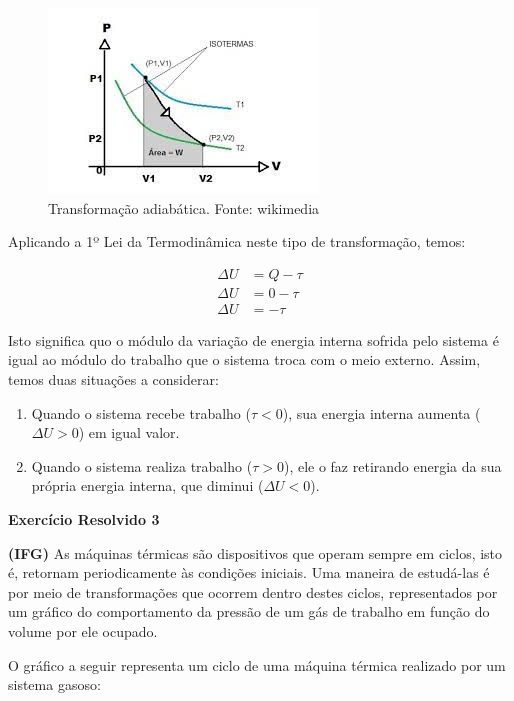 \documentclass[12pt]{article}
\begin{document}
\begin{figure}[h]{}
\centering\includegraphics[width=2.5truein]{img11.jpg}
\caption{Transformação adiabática. Fonte: wikimedia}
\centering
\end{figure}

Aplicando a 1º Lei da Termodinâmica neste tipo de transformação, temos:


\begin{align*}
    \Delta U &= Q - \tau\\
    \Delta U &= 0 - \tau\\
    \Delta U &= -\tau
\end{align*}


Isto significa quo o módulo da variação de energia interna sofrida pelo sistema é igual ao módulo do trabalho que o sistema troca com o meio externo. Assim, temos duas situações a considerar:


\begin{enumerate}

\item{Quando o sistema recebe trabalho ($\tau<0$), sua energia interna aumenta ($\Delta U>0$) em igual valor.}

\item{Quando o sistema realiza trabalho ($\tau>0$), ele o faz retirando energia da sua própria energia interna, que diminui ($\Delta U<0$).}

\end{enumerate}


\textbf{Exercício Resolvido 3}


\textbf{(IFG)} As máquinas térmicas são dispositivos que operam sempre em ciclos, isto é, retornam periodicamente às condições iniciais. Uma maneira de estudá-las é por meio de transformações que ocorrem dentro destes ciclos, representados por um gráfico do comportamento da pressão de um gás de trabalho em função do volume por ele ocupado.


O gráfico a seguir representa um ciclo de uma máquina térmica realizado por um sistema gasoso:
\end{document}
